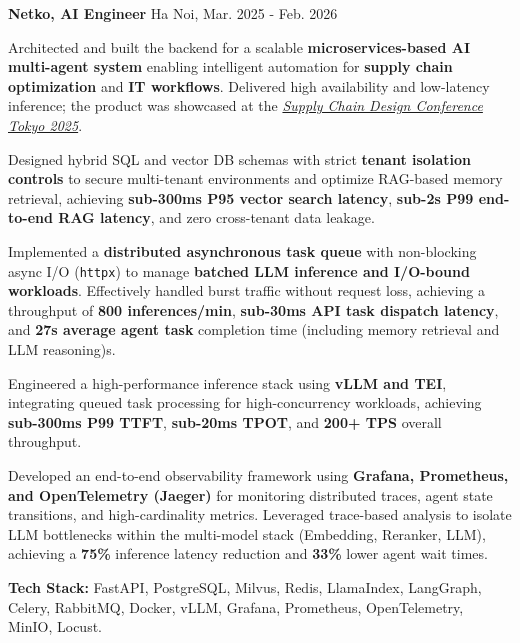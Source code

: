 \begin{cventries} %
  \cvsimpleentry
    {\textbf{Netko, AI Engineer}} %
    {Ha Noi, Mar. 2025 - Feb. 2026} %
    {
      \begin{cvitems} %
        \item {Architected and built the backend for a scalable \textbf{microservices-based AI multi-agent system} enabling intelligent automation for \textbf{supply chain optimization} and \textbf{IT workflows}. Delivered high availability and low-latency inference; the product was showcased at the \textit{\href{https://www.linkedin.com/posts/bigm-kk_supplychaindesign-supplychainoptimization-activity-7262605306784813056-VKYM/?utm_source=share&utm_medium=member_desktop&rcm=ACoAAGNdCGoBivrb0vpmUYAIo2o8013qSROCoWo}{Supply Chain Design Conference Tokyo 2025}}.}
        \item {Designed hybrid SQL and vector DB schemas with strict \textbf{tenant isolation controls} to secure multi-tenant environments and optimize RAG-based memory retrieval, achieving \textbf{sub-300ms P95 vector search latency}, \textbf{sub-2s P99 end-to-end RAG latency}, and zero cross-tenant data leakage.}
        \item {Implemented a \textbf{distributed asynchronous task queue} with non-blocking async I/O (\texttt{httpx}) to manage \textbf{batched LLM inference and I/O-bound workloads}. Effectively handled burst traffic without request loss, achieving a throughput of \textbf{800 inferences/min}, \textbf{sub-30ms API task dispatch latency}, and \textbf{27s average agent task} completion time (including memory retrieval and LLM reasoning)s.}
        \item {Engineered a high-performance inference stack using \textbf{vLLM and TEI}, integrating queued task processing for high-concurrency workloads, achieving \textbf{sub-300ms P99 TTFT},  \textbf{sub-20ms TPOT}, and  \textbf{200+ TPS} overall throughput.}
        \item {Developed an end-to-end observability framework using \textbf{Grafana, Prometheus, and OpenTelemetry (Jaeger)} for monitoring distributed traces, agent state transitions, and high-cardinality metrics. Leveraged trace-based analysis to isolate LLM bottlenecks within the multi-model stack (Embedding, Reranker, LLM), achieving a \textbf{75\%} inference latency reduction and \textbf{33\%} lower agent wait times.}
        \item {\textbf{Tech Stack:} FastAPI, PostgreSQL, Milvus, Redis, LlamaIndex, LangGraph, Celery, RabbitMQ, Docker, vLLM, Grafana, Prometheus, OpenTelemetry, MinIO, Locust.}

\end{cvitems}}
\end{cventries}
